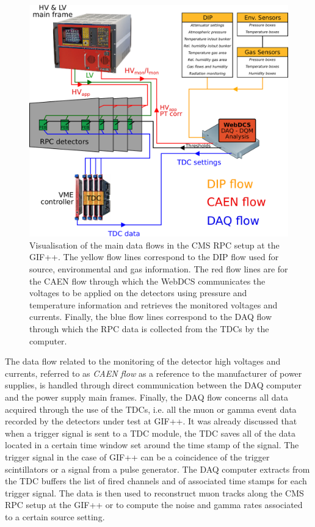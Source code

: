 	\begin{figure}[H]
        \centering
		\includegraphics[width = 0.9\linewidth]{fig/chapt5/GIFpp-setup.pdf}
		\caption{\label{fig:dataflow} Visualisation of the main data flows in the CMS RPC setup at the GIF++. The yellow flow lines correspond to the DIP flow used for source, environmental and gas information. The red flow lines are for the CAEN flow through which the WebDCS communicates the voltages to be applied on the detectors using pressure and temperature information and retrieves the monitored voltages and currents. Finally, the blue flow lines correspond to the DAQ flow through which the RPC data is collected from the TDCs by the computer.}
	\end{figure}
	
	The data flow related to the monitoring of the detector high voltages and currents, referred to as \textit{CAEN flow} as a reference to the manufacturer of power supplies, is handled through direct communication between the DAQ computer and the power supply main frames. Finally, the DAQ flow concerns all data acquired through the use of the TDCs, i.e. all the muon or gamma event data recorded by the detectors under test at GIF++. It was already discussed that when a trigger signal is sent to a TDC module, the TDC saves all of the data located in a certain time window set around the time stamp of the signal. The trigger signal in the case of GIF++ can be a coincidence of the trigger scintillators or a signal from a pulse generator. The DAQ computer extracts from the TDC buffers the list of fired channels and of associated time stamps for each trigger signal. The data is then used to reconstruct muon tracks along the CMS RPC setup at the GIF++ or to compute the noise and gamma rates associated to a certain source setting.

